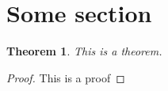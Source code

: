 \documentclass[10pt]{article}
\theoremstyle{plain}
\newtheorem{theorem}[equation]{Theorem}
\theoremstyle{definition}
\theoremstyle{remark}
\begin{document}
\section{Some section}

\begin{theorem}
This is a theorem.
\end{theorem}

\begin{proof}
This is a proof
\end{proof}
\end{document}

